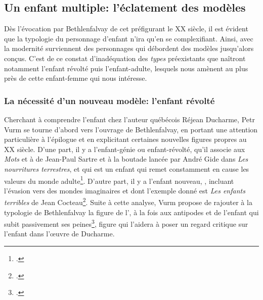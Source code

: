 \subsection{Un enfant multiple: l'éclatement des modèles}
Dès l'évocation par Bethlenfalvay de cet  préfigurant le XX siècle, il est évident que la typologie du personnage d'enfant n'ira qu'en se complexifiant.
Ainsi, avec la modernité surviennent des personnages qui débordent des modèles jusqu'alors conçus.
C'est de ce constat d'inadéquation des \textit{types} préexistants que naîtront notamment l'enfant révolté puis l'enfant-adulte, lesquels nous amènent au plus près de cette enfant-femme qui nous intéresse.

\subsubsection{La nécessité d'un nouveau modèle: l'enfant révolté}
Cherchant à comprendre l'enfant chez l'auteur québécois Réjean Ducharme, Petr Vurm se tourne d'abord vers l'ouvrage de Bethlenfalvay, en portant une attention particulière à l'épilogue et en explicitant certaines nouvelles figures propres au XX siècle.
D'une part, il y a l'enfant-génie ou enfant-révolté, qu'il associe aux \textit{Mots} et à  de Jean-Paul Sartre et à la boutade  lancée par André Gide dans \textit{Les nourritures terrestres}, et qui est un enfant qui remet constamment en cause les valeurs du monde adulte\footcite[93]{Vurm2014}.
D'autre part, il y a l'enfant nouveau, , incluant l'évasion vers des mondes imaginaires et dont l'exemple donné est \textit{Les enfants terribles} de Jean Cocteau\footcite[93]{Vurm2014}.
Suite à cette analyse, Vurm propose de rajouter à la typologie de Bethlenfalvay la figure de l', à la fois aux antipodes et  de l'enfant qui subit passivement ses peines\footcite[94]{Vurm2014}, figure qui l'aidera à poser un regard critique sur l'enfant dans l'\oe{}uvre de Ducharme.

